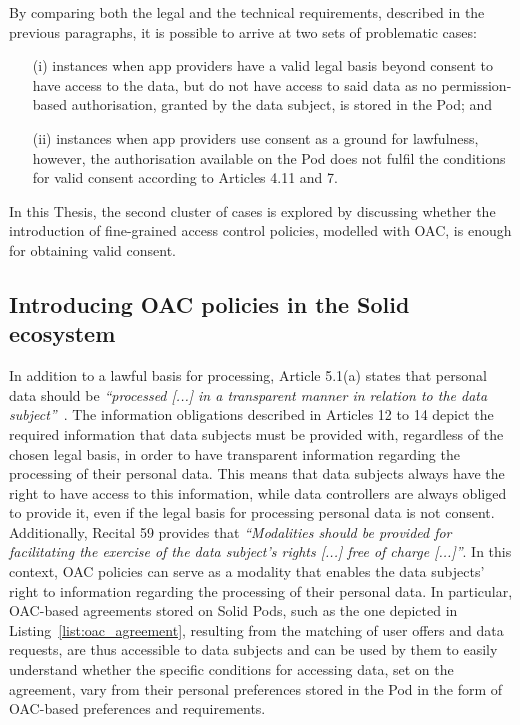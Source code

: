 By comparing both the legal and the technical requirements, described in the previous paragraphs, it is possible to arrive at two sets of problematic cases:
\begin{itemize}
    \item[(i)] instances when app providers have a valid legal basis beyond consent to have access to the data, but do not have access to said data as no permission-based authorisation, granted by the data subject, is stored in the Pod; and
    \item[(ii)] instances when app providers use consent as a ground for lawfulness, however, the authorisation available on the Pod does not fulfil the conditions for valid consent according to Articles 4.11 and 7.
\end{itemize}

In this Thesis, the second cluster of cases is explored by discussing whether the introduction of fine-grained access control policies, modelled with OAC, is enough for obtaining valid consent.

\subsection{Introducing OAC policies in the Solid ecosystem} %
\label{sec:oac_notice_automation}

In addition to a lawful basis for processing, Article 5.1(a) states that personal data should be \textit{``processed [...] in a transparent manner in relation to the data subject''}~\citeyearpar{noauthor_regulation_2016}.
The information obligations described in Articles 12 to 14 depict the required information that data subjects must be provided with, regardless of the chosen legal basis, in order to have transparent information regarding the processing of their personal data.
This means that data subjects always have the right to have access to this information, while data controllers are always obliged to provide it, even if the legal basis for processing personal data is not consent.
Additionally, Recital 59 provides that \textit{``Modalities should be provided for facilitating the exercise of the data subject’s rights [...] free of charge [...]''}.
In this context, OAC policies can serve as a modality that enables the data subjects' right to information regarding the processing of their personal data.
In particular, OAC-based agreements stored on Solid Pods, such as the one depicted in Listing~\ref{list:oac_agreement}, resulting from the matching of user offers and data requests,  are thus accessible to data subjects and can be used by them to easily understand whether the specific conditions for accessing data, set on the agreement, vary from their personal preferences stored in the Pod in the form of OAC-based preferences and requirements.

